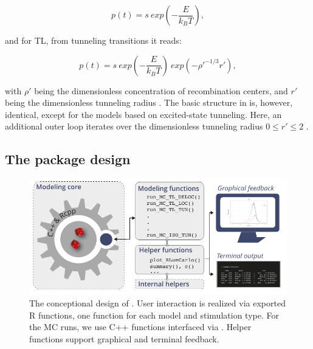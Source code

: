 \begin{equation}
p(t) = s~exp(-\frac{E}{k_{B}T}),
\end{equation}

\noindent{}and for TL, from tunneling transitions it reads:

\begin{equation}
p(t) = s~exp(-\frac{E}{k_{B}T})~exp(-\rho'^{-1/3}r'),
\end{equation}

\noindent{}with \(\rho'\) being the dimensionless concentration of recombination
centers, and \(r'\) being the dimensionless tunneling radius
\citep{Huntley:2006gs}. The basic structure in  is,
however, identical, except for the models based on excited-state
tunneling. Here, an additional outer loop iterates over the
dimensionless tunneling radius \(0 \leqslant r' \leqslant 2\)
\citep{Huntley:2006gs}.

\hypertarget{the-package-design}{%
\subsection{The package design}\label{the-package-design}}

\begin{figure}[h]
\begin{center}
\includegraphics[width=.8\textwidth]{figures/Fig3-1.pdf}
\caption{The conceptional design of . User interaction is realized via exported R functions, one function for each model and stimulation type. For the MC runs, we use C++ functions interfaced via . Helper functions support 
graphical and terminal feedback.}
\label{fig:Fig3}
\end{center}
\end{figure}

